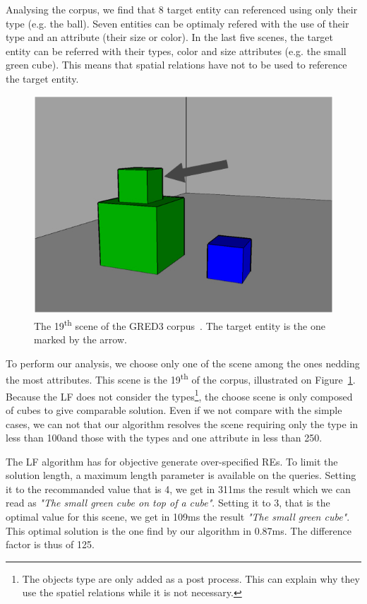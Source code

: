 Analysing the corpus, we find that 8 target entity can referenced using only their type (e.g. the ball). Seven entities can be optimaly refered with the use of their type and an attribute (their size or color). In the last five scenes, the target entity can be referred with their types, color and size attributes (e.g. the small green cube). This means that spatial relations have not to be used to reference the target entity. 

\begin{figure}[h!]
\centering
\includegraphics[scale=0.3]{figures/chapter4/GRED3.jpg}
\caption{\label{fig:chap4_gred3} The 19\textsuperscript{th} scene of the GRED3 corpus~\cite{dale_2009_referring}. The target entity is the one marked by the arrow.}
\end{figure}

To perform our analysis, we choose only one of the scene among the ones nedding the most attributes. This scene is the 19\textsuperscript{th} of the corpus, illustrated on Figure~\ref{fig:chap4_gred3}. Because the LF does not consider the types\footnote{The objects type are only added as a post process. This can explain why they use the spatiel relations while it is not necessary.}, the choose scene is only composed of cubes to give comparable solution. Even if we not compare with the simple cases, we can not that our algorithm resolves the scene requiring only the type in less than 100\us and those with the types and one attribute in less than 250\us.

The LF algorithm has for objective generate over-specified REs. To limit the solution length, a maximum length parameter is available on the queries. Setting it to the recommanded value that is 4, we get in 311ms the result which we can read as \textit{"The small green cube on top of a cube"}. Setting it to 3, that is the optimal value for this scene, we get in 109ms the result \textit{"The small green cube"}. This optimal solution is the one find by our algorithm in 0.87ms. The difference factor is thus of 125.

